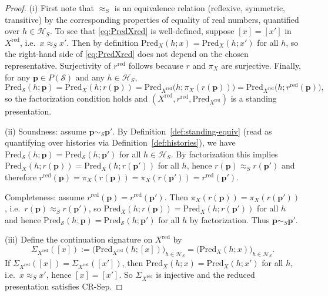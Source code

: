 \documentclass[11pt]{article}
\theoremstyle{remark}
\newcommand{\Skin}{\mathcal{S}}
\begin{document}
\begin{proof}
(i) First note that $\approx_S$ is an equivalence relation (reflexive, symmetric, transitive) by the
corresponding properties of equality of real numbers, quantified over $h\in\mathcal{H}_S$.
To see that \eqref{eq:PredXred} is well-defined, suppose $[x]=[x']$ in $X^{\mathrm{red}}$, i.e.\ $x\approx_S x'$.
Then by definition $\mathrm{Pred}_X(h;x)=\mathrm{Pred}_X(h;x')$ for all $h$, so the right-hand side of
\eqref{eq:PredXred} does not depend on the chosen representative. Surjectivity of $r^{\mathrm{red}}$ follows
because $r$ and $\pi_X$ are surjective. Finally, for any $\mathbf{p}\in P(\Skin)$ and any $h\in\mathcal{H}_S$,
\[
\mathrm{Pred}_{\Skin}(h;\mathbf{p})
=\mathrm{Pred}_X(h;r(\mathbf{p}))
=\mathrm{Pred}_{X^{\mathrm{red}}}\big(h;\pi_X(r(\mathbf{p}))\big)
=\mathrm{Pred}_{X^{\mathrm{red}}}\big(h;r^{\mathrm{red}}(\mathbf{p})\big),
\]
so the factorization condition holds and $(X^{\mathrm{red}},r^{\mathrm{red}},\mathrm{Pred}_{X^{\mathrm{red}}})$
is a standing presentation.

(ii) Soundness: assume $\mathbf{p}\sim_S \mathbf{p}'$. By Definition~\ref{def:standing-equiv} (read as quantifying
over histories via Definition~\ref{def:histories}), we have
$\mathrm{Pred}_{\Skin}(h;\mathbf{p})=\mathrm{Pred}_{\Skin}(h;\mathbf{p}')$ for all $h\in\mathcal{H}_S$.
By factorization this implies
$\mathrm{Pred}_X(h;r(\mathbf{p}))=\mathrm{Pred}_X(h;r(\mathbf{p}'))$ for all $h$, hence
$r(\mathbf{p})\approx_S r(\mathbf{p}')$ and therefore
$r^{\mathrm{red}}(\mathbf{p})=\pi_X(r(\mathbf{p}))=\pi_X(r(\mathbf{p}'))=r^{\mathrm{red}}(\mathbf{p}')$.

Completeness: assume $r^{\mathrm{red}}(\mathbf{p})=r^{\mathrm{red}}(\mathbf{p}')$. Then
$\pi_X(r(\mathbf{p}))=\pi_X(r(\mathbf{p}'))$, i.e.\ $r(\mathbf{p})\approx_S r(\mathbf{p}')$, so
$\mathrm{Pred}_X(h;r(\mathbf{p}))=\mathrm{Pred}_X(h;r(\mathbf{p}'))$ for all $h$ and hence
$\mathrm{Pred}_{\Skin}(h;\mathbf{p})=\mathrm{Pred}_{\Skin}(h;\mathbf{p}')$ for all $h$ by factorization.
Thus $\mathbf{p}\sim_S \mathbf{p}'$.

(iii) Define the continuation signature on $X^{\mathrm{red}}$ by
\[
\Sigma_{X^{\mathrm{red}}}([x]) := \big(\mathrm{Pred}_{X^{\mathrm{red}}}(h;[x])\big)_{h\in\mathcal{H}_S}
=\big(\mathrm{Pred}_X(h;x)\big)_{h\in\mathcal{H}_S}.
\]
If $\Sigma_{X^{\mathrm{red}}}([x])=\Sigma_{X^{\mathrm{red}}}([x'])$, then
$\mathrm{Pred}_X(h;x)=\mathrm{Pred}_X(h;x')$ for all $h$, i.e.\ $x\approx_S x'$, hence $[x]=[x']$.
So $\Sigma_{X^{\mathrm{red}}}$ is injective and the reduced presentation satisfies CR-Sep.
\end{proof}
\end{document}
